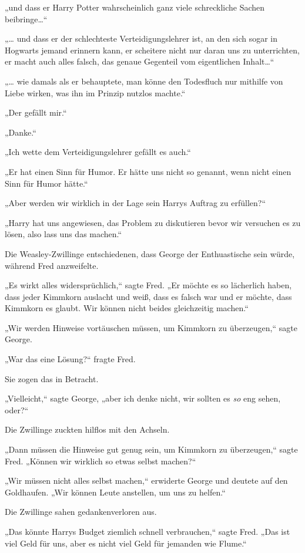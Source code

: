 {„und dass er Harry Potter wahrscheinlich ganz viele schreckliche Sachen beibringe…“

„… und dass er der schlechteste Verteidigungslehrer ist, an den sich sogar in Hogwarts jemand erinnern kann, er scheitere nicht nur daran uns zu unterrichten, er macht auch alles falsch, das genaue Gegenteil vom eigentlichen Inhalt…“

„… wie damals als er behauptete, man könne den Todesfluch nur mithilfe von Liebe wirken, was ihn im Prinzip nutzlos machte.“

„Der gefällt mir.“

„Danke.“

„Ich wette dem Verteidigungslehrer gefällt es auch.“

„Er hat einen Sinn für Humor. Er hätte uns nicht so genannt, wenn nicht einen Sinn für Humor hätte.“

„Aber werden wir wirklich in der Lage sein Harrys Auftrag zu erfüllen?“

„Harry hat uns angewiesen, das Problem zu diskutieren bevor wir versuchen es zu lösen, also lass uns das machen.“

Die Weasley-Zwillinge entschiedenen, dass George der Enthuastische sein würde, während Fred anzweifelte.

„Es wirkt alles widersprüchlich,“ sagte Fred. „Er möchte es so lächerlich haben, dass jeder Kimmkorn auslacht und weiß, dass es falsch war und er möchte, dass Kimmkorn es glaubt. Wir können nicht beides gleichzeitig machen.“

„Wir werden Hinweise vortäuschen müssen, um Kimmkorn zu überzeugen,“ sagte George.

„War das eine Lösung?“ fragte Fred.

Sie zogen das in Betracht.

„Vielleicht,“ sagte George, „aber ich denke nicht, wir sollten es \emph{so} eng sehen, oder?“

Die Zwillinge zuckten hilflos mit den Achseln.

„Dann müssen die Hinweise gut genug sein, um Kimmkorn zu überzeugen,“ sagte Fred. „Können wir wirklich so etwas selbst machen?“

„Wir müssen nicht alles selbst machen,“ erwiderte George und deutete auf den Goldhaufen. „Wir können Leute anstellen, um uns zu helfen.“

Die Zwillinge sahen gedankenverloren aus.

„Das könnte Harrys Budget ziemlich schnell verbrauchen,“ sagte Fred. „Das ist viel Geld für uns, aber es nicht viel Geld für jemanden wie Flume.“

}

